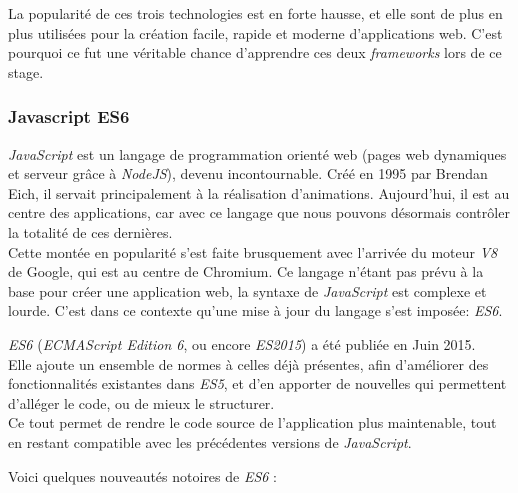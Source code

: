 \bigskip

La popularité de ces trois technologies est en forte hausse, et elle
sont de plus en plus utilisées pour la création facile, rapide et
moderne d'applications web. C'est pourquoi ce fut une véritable chance
d'apprendre ces deux \emph{frameworks} lors de ce stage.

\bigskip

\subsubsection{Javascript ES6}\label{javascript-es6}

\bigskip

\emph{JavaScript} est un langage de programmation orienté web (pages web
dynamiques et serveur grâce à \emph{NodeJS}), devenu incontournable.
Créé en 1995 par Brendan Eich, il servait principalement à la
réalisation d'animations. Aujourd'hui, il est au centre des
applications, car avec ce langage que nous pouvons désormais contrôler
la totalité de ces dernières.\\
Cette montée en popularité s'est faite brusquement avec l'arrivée du
moteur \emph{V8} de Google, qui est au centre de Chromium. Ce langage
n'étant pas prévu à la base pour créer une application web, la syntaxe
de \emph{JavaScript} est complexe et lourde. C'est dans ce contexte
qu'une mise à jour du langage s'est imposée: \emph{ES6}.

\bigskip

\emph{ES6} (\emph{ECMAScript Edition 6}, ou encore \emph{ES2015}) a été
publiée en Juin 2015.\\
Elle ajoute un ensemble de normes à celles déjà présentes, afin
d'améliorer des fonctionnalités existantes dans \emph{ES5}, et d'en
apporter de nouvelles qui permettent d'alléger le code, ou de mieux le
structurer.\\
Ce tout permet de rendre le code source de l'application plus
maintenable, tout en restant compatible avec les précédentes versions de
\emph{JavaScript}.

\bigskip

Voici quelques nouveautés notoires de \emph{ES6} :

